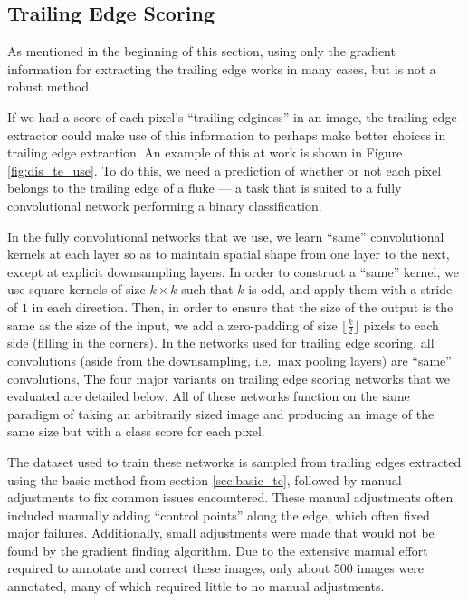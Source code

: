 \subsection{Trailing Edge Scoring}

As mentioned in the beginning of this section, using only the gradient information for extracting the trailing edge works in many cases, but is not a robust method.

If we had a score of each pixel's ``trailing edginess'' in an image, the trailing edge extractor could make use of this information to perhaps make better choices in trailing edge extraction.
An example of this at work is shown in Figure \ref{fig:dis_te_use}.
To do this, we need a prediction of whether or not each pixel belongs to the trailing edge of a fluke --- a task that is suited to a fully convolutional network performing a binary classification.

In the fully convolutional networks that we use, we learn ``same'' convolutional kernels at each layer so as to maintain spatial shape from one layer to the next, except at explicit downsampling layers.
In order to construct a ``same'' kernel, we use square kernels of size $k \times k$ such that $k$ is odd, and apply them with a stride of $1$ in each direction.
Then, in order to ensure that the size of the output is the same as the size of the input, we add a zero-padding of size $\lfloor \frac{k}{2} \rfloor$ pixels to each side (filling in the corners).
In the networks used for trailing edge scoring, all convolutions (aside from the downsampling, i.e.\ max pooling layers) are ``same'' convolutions,
The four major variants on trailing edge scoring networks that we evaluated are detailed below.
All of these networks function on the same paradigm of taking an arbitrarily sized image and producing an image of the same size but with a class score for each pixel.

The dataset used to train these networks is sampled from trailing edges extracted using the basic method from section \ref{sec:basic_te}, followed by manual adjustments to fix common issues encountered.
These manual adjustments often included manually adding ``control points'' along the edge, which often fixed major failures.
Additionally, small adjustments were made that would not be found by the gradient finding algorithm.
Due to the extensive manual effort required to annotate and correct these images, only about $500$ images were annotated, many of which required little to no manual adjustments.

